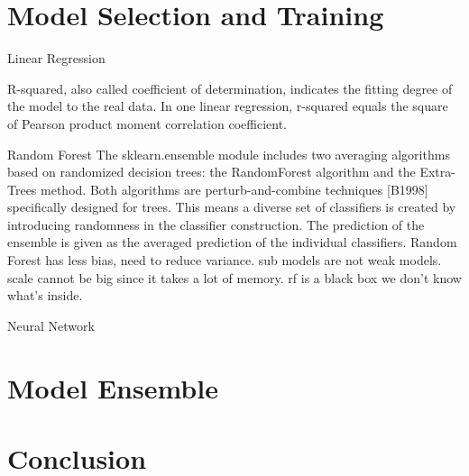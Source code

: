 \documentclass[conference]{IEEEtran}
\begin{document}
\section{Model Selection and Training}\label{v}
\indent Linear Regression

R-squared, also called coefficient of determination, indicates the fitting degree of the model to the real data. In one linear regression, r-squared equals the square of Pearson product moment correlation coefficient.

\indent Random Forest
The sklearn.ensemble module includes two averaging algorithms based on randomized decision trees: the RandomForest algorithm and the Extra-Trees method. Both algorithms are perturb-and-combine techniques [B1998] specifically designed for trees. This means a diverse set of classifiers is created by introducing randomness in the classifier construction. The prediction of the ensemble is given as the averaged prediction of the individual classifiers.
Random Forest has less bias, need to reduce variance. sub models are not weak models.
scale cannot be big since it takes a lot of memory. rf is a black box we don't know what's inside.

\indent Neural Network \\

%
\section{Model Ensemble}\label{vi}
%
\section{Conclusion}\label{vii}
%
\end{document}
